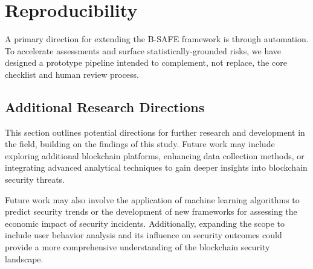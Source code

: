 \section{Reproducibility}
\label{sec:reproducibility}

A primary direction for extending the B-SAFE framework is through automation. To accelerate assessments and surface statistically-grounded risks, we have designed a prototype pipeline intended to complement, not replace, the core checklist and human review process.



\subsection{Additional Research Directions}
This section outlines potential directions for further research and development in the field, building on the findings of this study. Future work may include exploring additional blockchain platforms, enhancing data collection methods, or integrating advanced analytical techniques to gain deeper insights into blockchain security threats.

Future work may also involve the application of machine learning algorithms to predict security trends or the development of new frameworks for assessing the economic impact of security incidents. Additionally, expanding the scope to include user behavior analysis and its influence on security outcomes could provide a more comprehensive understanding of the blockchain security landscape.